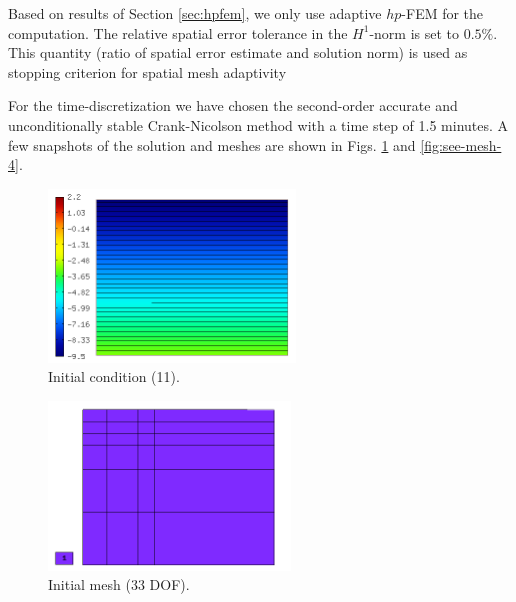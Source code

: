 \documentclass[final,3p,times,twocolumn]{elsarticle}
\begin{document}
Based on results of Section \ref{sec:hpfem}, we only use adaptive $hp$-FEM
for the computation. The relative spatial error tolerance in the $H^1$-norm
is set to $0.5 \%$. This quantity (ratio of spatial error estimate and 
solution norm) is used as stopping criterion for spatial mesh adaptivity

For the time-discretization we have chosen the second-order accurate 
and unconditionally stable Crank-Nicolson method with a 
time step of 1.5 minutes. A few snapshots of the solution and meshes 
are shown in Figs. \ref{fig:see-sol-0} and \ref{fig:see-mesh-4}.

\begin{figure}[!ht]
\begin{center}
\vspace{-1mm}
\hspace{-0mm}
\includegraphics[height=4.6cm]{see_sol_0.png}
\end{center}
\vspace{-6mm}
\caption{Initial condition (11).}
\label{fig:see-sol-0}
\end{figure}

\begin{figure}[!ht]
\begin{center}
\vspace{-2mm}
\hspace{6mm}
\includegraphics[height=4.5cm]{see_mesh_0.png}
\end{center}
\vspace{-6mm}
\caption{Initial mesh (33 DOF).}
\label{fig:see-mesh-0}
\end{figure}
\end{document}
